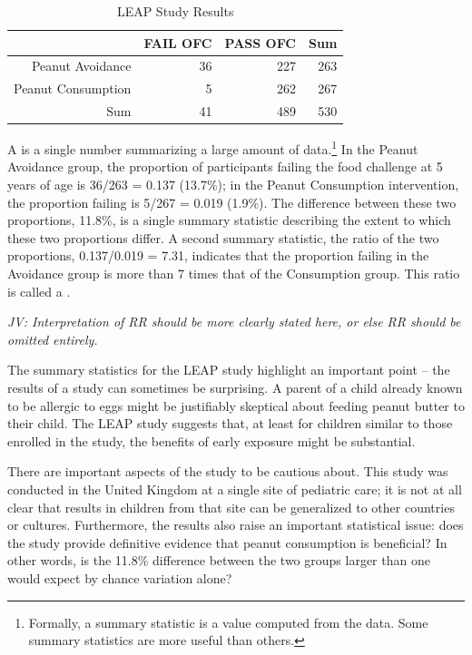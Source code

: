 \begin{doublespace}
\begin{table}[ht]
\centering
\begin{tabular}{rrrr}
  \hline
 & FAIL OFC & PASS OFC & Sum \\ 
  \hline
Peanut Avoidance & 36 & 227 & 263 \\ 
  Peanut Consumption & 5 & 262 & 267 \\ 
  Sum & 41 & 489 & 530 \\ 
   \hline
\end{tabular}
\caption{LEAP Study Results} 
\label{leapStudyResults}
\end{table}

A  is a single number summarizing a large amount of data.\footnote{Formally, a summary statistic is a value computed from the data. Some summary statistics are more useful than others.} In the Peanut Avoidance group, the proportion of participants failing the food challenge at 5 years of age is 36/263 = 0.137 (13.7\%); in the Peanut Consumption intervention, the proportion failing is 5/267 = 0.019 (1.9\%). The difference between these two proportions, 11.8\%, is a single summary statistic describing the extent to which these two proportions differ. A second summary statistic, the ratio of the two proportions, 0.137/0.019 = 7.31, indicates that the proportion failing in the Avoidance group is more than 7 times that of the Consumption group.   This ratio is called a .
	
\textit{JV: Interpretation of RR should be more clearly stated here, or else RR should be omitted entirely.}

The summary statistics for the LEAP study highlight an important point -- the results of a study can sometimes be surprising.  A parent of a child already known to be allergic to eggs might be justifiably skeptical about feeding peanut butter to their child.  The LEAP study suggests that, at least for children similar to those enrolled in the study, the benefits of early exposure might be substantial. 

There are important aspects of the study to be cautious about.  This study was conducted in the United Kingdom at a single site of pediatric care; it is not at all clear that results in children from that site can be generalized to other countries or cultures.  Furthermore, the results also raise an important statistical issue: does the study provide definitive evidence that peanut consumption is beneficial? In other words, is the 11.8\% difference between the two groups larger than one would expect by chance variation alone? 


\end{doublespace}
